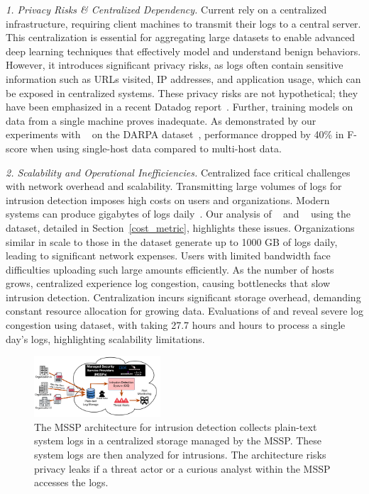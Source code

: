 \noindent
\textit{1. Privacy Risks \& Centralized Dependency.} Current \pids rely on a centralized infrastructure, requiring client machines to transmit their logs to a central server. This centralization is essential for aggregating large datasets to enable advanced deep learning techniques that effectively model and understand benign behaviors. However, it introduces significant privacy risks, as logs often contain sensitive information such as URLs visited, IP addresses, and application usage, which can be exposed in centralized systems. These privacy risks are not hypothetical; they have been emphasized in a recent Datadog report~\cite{datadog}. Further, training models on data from a single machine proves inadequate. As demonstrated by our experiments with \flash~\cite{flash2024} on the DARPA \optc dataset~\cite{darpaoptc}, performance dropped by 40\% in F-score when using single-host data compared to multi-host data.

    
\smallskip
\noindent
\textit{2. Scalability and Operational Inefficiencies.}  Centralized \pids face critical challenges with network overhead and scalability. Transmitting large volumes of logs for intrusion detection imposes high costs on users and organizations. Modern systems can produce gigabytes of logs daily~\cite{inam2023sok,hossain+depend}. Our analysis of \flash~\cite{flash2024} and \kairos~\cite{cheng2023kairos} using the \optc dataset, detailed in Section~\ref{cost_metric}, highlights these issues. Organizations similar in scale to those in the \optc dataset generate up to 1000 GB of logs daily, leading to significant network expenses. Users with limited bandwidth face difficulties uploading such large amounts efficiently. As the number of hosts grows, centralized \pids experience log congestion, causing bottlenecks that slow intrusion detection. Centralization incurs significant storage overhead, demanding constant resource allocation for growing data. Evaluations of \flash and \kairos reveal severe log congestion using \optc dataset, with \flash taking 27.7 hours and  hours to process a single day's logs, highlighting scalability limitations.


\begin{figure}[t!]
  \centering
  \includegraphics[width=0.42\textwidth]{fig/mssp.pdf}
  \caption{The MSSP architecture for intrusion detection collects plain-text system logs in a centralized storage managed by the MSSP. These system logs are then analyzed for intrusions. The architecture risks privacy leaks if a threat actor or a curious analyst within the MSSP accesses the logs.}
  \label{mssp}
  \vspace{-4ex}
\end{figure}

